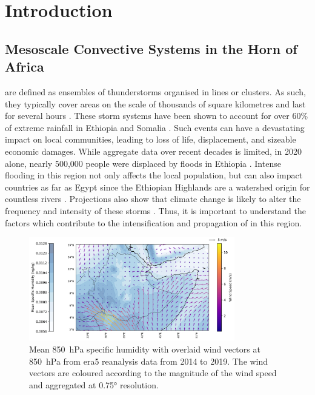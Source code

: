 \chapter{Introduction}
\label{ch:intro}

\section{Mesoscale Convective Systems in the Horn of Africa}

 are defined as ensembles of thunderstorms organised in lines or clusters. As such, they typically cover areas on the scale of thousands of square kilometres and last for several hours \citep{Houze2004}. These storm systems have been shown to account for over 60\% of extreme rainfall in Ethiopia and Somalia \citep{Hill2023}. Such events can have a devastating impact on local communities, leading to loss of life, displacement, and sizeable economic damages. While aggregate data over recent decades is limited, in 2020 alone, nearly 500,000 people were displaced by floods in Ethiopia \citep{Mekuria2022}. Intense flooding in this region not only affects the local population, but can also impact countries as far as Egypt since the Ethiopian Highlands are a watershed origin for countless rivers \citep{Mamo2019,Legese2020,Zaroug2014}. Projections also show that climate change is likely to alter the frequency and intensity of these storms \citep{Endris2019,Das2016,Li2023}. Thus, it is important to understand the factors which contribute to the intensification and propagation of  in this region.

\begin{figure}[ht]
    \centering
    \includegraphics[width=0.8\textwidth]{../figures/generated/exploration/mean_humidity_wind.png}
    \caption{Mean \SI{850}{\hecto\pascal} specific humidity with overlaid wind vectors at \SI{850}{\hecto\pascal} from \acrshort{era5} reanalysis data from 2014 to 2019. The wind vectors are coloured according to the magnitude of the wind speed and aggregated at \ang{0.75} resolution.}
    \label{fig:mean_humidity_wind}
\end{figure}

